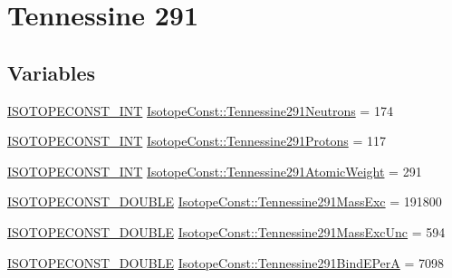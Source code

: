 \hypertarget{group___isotope_const-_tennessine-_ts291}{}\section{Tennessine 291}
\label{group___isotope_const-_tennessine-_ts291}
\subsection*{Variables}
\begin{DoxyCompactItemize}
\item 
\mbox{\hyperlink{group___isotope_const-_macros_ga5f18360b3e99483a35c32d789e62621c}{I\+S\+O\+T\+O\+P\+E\+C\+O\+N\+S\+T\+\_\+\+I\+NT}} \mbox{\hyperlink{group___isotope_const-_tennessine-_ts291_gade7536a8262245beff50d101ffd6d92c}{Isotope\+Const\+::\+Tennessine291\+Neutrons}} = 174
\item 
\mbox{\hyperlink{group___isotope_const-_macros_ga5f18360b3e99483a35c32d789e62621c}{I\+S\+O\+T\+O\+P\+E\+C\+O\+N\+S\+T\+\_\+\+I\+NT}} \mbox{\hyperlink{group___isotope_const-_tennessine-_ts291_ga0b1685c5a15472d05e575d7273da7917}{Isotope\+Const\+::\+Tennessine291\+Protons}} = 117
\item 
\mbox{\hyperlink{group___isotope_const-_macros_ga5f18360b3e99483a35c32d789e62621c}{I\+S\+O\+T\+O\+P\+E\+C\+O\+N\+S\+T\+\_\+\+I\+NT}} \mbox{\hyperlink{group___isotope_const-_tennessine-_ts291_ga435ee806953c75914dfcd40ef6537429}{Isotope\+Const\+::\+Tennessine291\+Atomic\+Weight}} = 291
\item 
\mbox{\hyperlink{group___isotope_const-_macros_ga8f45a7272ce02c0b4c65c44636ed719a}{I\+S\+O\+T\+O\+P\+E\+C\+O\+N\+S\+T\+\_\+\+D\+O\+U\+B\+LE}} \mbox{\hyperlink{group___isotope_const-_tennessine-_ts291_ga02556fb075c15b94a60c7ba526f4cd3b}{Isotope\+Const\+::\+Tennessine291\+Mass\+Exc}} = 191800
\item 
\mbox{\hyperlink{group___isotope_const-_macros_ga8f45a7272ce02c0b4c65c44636ed719a}{I\+S\+O\+T\+O\+P\+E\+C\+O\+N\+S\+T\+\_\+\+D\+O\+U\+B\+LE}} \mbox{\hyperlink{group___isotope_const-_tennessine-_ts291_ga3da709fa50a22c466c375cf668a9f87e}{Isotope\+Const\+::\+Tennessine291\+Mass\+Exc\+Unc}} = 594
\item 
\mbox{\hyperlink{group___isotope_const-_macros_ga8f45a7272ce02c0b4c65c44636ed719a}{I\+S\+O\+T\+O\+P\+E\+C\+O\+N\+S\+T\+\_\+\+D\+O\+U\+B\+LE}} \mbox{\hyperlink{group___isotope_const-_tennessine-_ts291_gaa7cc05b5fd05132deebfd5181dd392c1}{Isotope\+Const\+::\+Tennessine291\+Bind\+E\+PerA}} = 7098
\item 

\end{DoxyCompactItemize}
